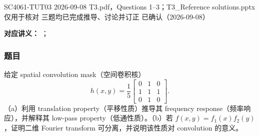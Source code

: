 
\label{tutorial:SC4061-TUT03}

\tutorialmeta
  {SC4061-TUT03}
  {2026-09-08}
  {T3.pdf，Questions 1--3；T3\_Reference solutions.pptx 仅用于核对}
  {三题均已完成推导、讨论并订正}
  {已确认（2026-09-08）}


\textbf{对应讲义：}
；

\subsubsection*{题目}

给定 spatial convolution mask（空间卷积核）
\[
  h(x,y)=\frac15
  \begin{bmatrix}
    0&1&0\\
    1&1&1\\
    0&1&0
  \end{bmatrix}.
\]
（a）利用 translation property（平移性质）推导其 frequency response（频率响应），并解释其 low-pass property（低通性质）。（b）若 $f(x,y)=f_1(x)f_2(y)$，证明二维 Fourier transform 可分离，并说明该性质对 convolution 的意义。

